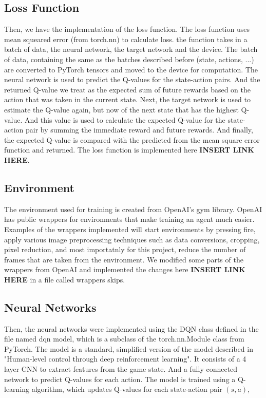 \documentclass[12pt, a4paper, twocolumn]{article} %
\begin{document}
\subsection{Loss Function}

Then, we have the implementation of the loss function. The loss function uses mean squeared error (from torch.nn) to calculate loss. the function takes in a batch of data, the neural network, the target network and the device. The batch of data, containing the same as the batches described before (state, actions, ...) are converted to PyTorch tensors and moved to the device for computation. The neural network is used to predict the Q-values for the state-action pairs. And the returned Q-value we treat as the expected sum of future rewards based on the action that was taken in the current state. Next, the target network is used to estimate the Q-value again, but now of the next state that has the highest Q-value. And this value is used to calculate the expected Q-value for the state-action pair by summing the immediate reward and future rewards. And finally, the expected Q-value is compared with the predicted from the mean square error function and returned. The loss function is implemented here \textbf{INSERT LINK HERE}. 

\subsection{Environment}

The environment used for training is created from OpenAI's gym library. OpenAI has public wrappers for environments that make training an agent much easier. Examples of the wrappers implemented will start environments by pressing fire, apply various image preprocessing techniques such as data conversions, cropping, pixel reduction, and most importatnly for this project, reduce the number of frames that are taken from the environment. We modified some parts of the wrappers from OpenAI and implemented the changes here \textbf{INSERT LINK HERE} in a file called wrappers skips. 

\subsection{Neural Networks}

Then, the neural networks were implemented using the DQN class defined in the file named dqn model, which is a subclass of the torch.nn.Module class from PyTorch. The model is a standard, simplified version of the model described in "Human-level control through deep reinforcement learning". It consists of a 4 layer CNN to extract features from the game state. And a fully connected network to predict Q-values for each action. The model is trained using a Q-learning algorithm, which updates Q-values for each state-action pair $(s,a)$,
\end{document}

